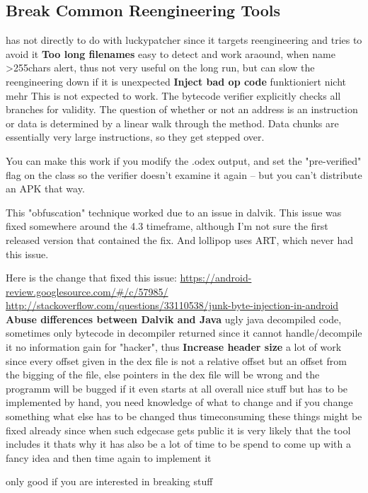 \subsection{Break Common Reengineering Tools}
\label{subsection:evaluation-reengineering-break}
has not directly to do with luckypatcher since it targets reengineering and tries to avoid it
\newline
\newline
\textbf{Too long filenames} \newline
easy to detect and work araound, when name >255chars alert, thus not very useful on the long run, but can slow the reengineering down if it is unexpected
\newline
\newline
\textbf{Inject bad op code} \newline
funktioniert nicht mehr
This is not expected to work. The bytecode verifier explicitly checks all branches for validity. The question of whether or not an address is an instruction or data is determined by a linear walk through the method. Data chunks are essentially very large instructions, so they get stepped over.

You can make this work if you modify the .odex output, and set the "pre-verified" flag on the class so the verifier doesn't examine it again -- but you can't distribute an APK that way.

This "obfuscation" technique worked due to an issue in dalvik. This issue was fixed somewhere around the 4.3 timeframe, although I'm not sure the first released version that contained the fix. And lollipop uses ART, which never had this issue.

Here is the change that fixed this issue: \url{https://android-review.googlesource.com/#/c/57985/}
\url{http://stackoverflow.com/questions/33110538/junk-byte-injection-in-android}
%
\newline
\newline
\textbf{Abuse differences between Dalvik and Java} \newline
ugly java decompiled code, sometimes only bytecode in decompiler returned since it cannot handle/decompile it
no information gain for "hacker", thus
\newline
\newline
\textbf{Increase header size} \newline
a lot of work since every offset given in the dex file is not a relative offset but an offset from the bigging of the file, else pointers in the dex file will be wrong and the programm will be bugged if it even starts at all
overall nice stuff but has to be implemented by hand, you need knowledge of what to change and if you change something what else has to be changed thus timeconsuming
these things might be fixed already since when such edgecase gets public it is very likely that the tool includes it thats why it has also be a lot of time to be spend to come up with a fancy idea and then time again to implement it

only good if you are interested in breaking stuff
